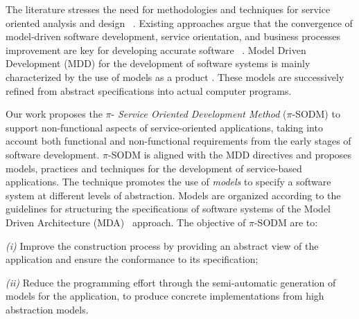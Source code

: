 




The literature stresses the need for methodologies and techniques for service oriented analysis and design 
~\cite{5}. Existing approaches argue that the convergence of model-driven software development, service orientation,   and  business processes improvement are key for developing accurate  software 
~\cite{watson}. Model Driven Development (MDD)  for the development of software systems is mainly characterized by the use of models as a product \cite{Selic03}.
%
These models are successively refined from abstract specifications into actual computer programs.

Our work proposes  the $\pi$-\textit{ Service Oriented Development Method} ($\pi$-SODM)
to support non-functional aspects of service-oriented applications, taking into account both functional and non-functional requirements from the early stages of software development.
$\pi$-SODM is aligned with the MDD directives and proposes models, practices and techniques for the development of service-based applications.  The technique promotes  the use of \textit{models} to specify a software system at different levels of abstraction. Models are organized according to the guidelines for structuring the specifications of software systems of the Model Driven Architecture (MDA)~\cite{miller} approach. The objective of  $\pi$-SODM are to:
\begin{trivlist}
\item \textit{(i)} Improve the construction process by providing an abstract view of the application and ensure the conformance to its specification;
\item \textit{(ii)} Reduce the programming effort through the semi-automatic generation of  models for the application, to produce concrete implementations from high abstraction models.
\end{trivlist}

